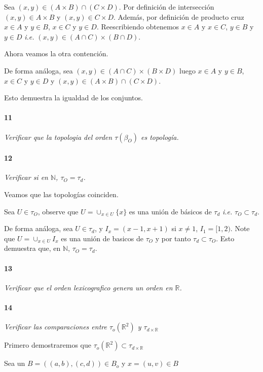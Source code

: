 \documentclass[12pt]{article}
\begin{document}
Sea $(x,y) \in (A \times B) \cap (C \times D)$. Por definición de intersección $(x,y)\in A\times B$ y $(x,y) \in C\times D$. Además, por definición
de producto cruz $x \in A $ y $y \in B$, $x \in C$ y $y \in D$. Reescribiendo obtenemos $x\in A$ y $x\in C$, $y \in B$ y $y\in D$ \textit{i.e.}  $(x,y) \in (A \cap C)\times (B \cap D)$.

Ahora veamos la otra contención.

De forma análoga, sea $(x,y) \in (A \cap C) \times (B \times D)$ luego  $x \in A $ y $y \in B$, $x \in C$ y $y \in D$ y $(x,y) \in (A \times B) \cap (C \times D)$.

Esto demuestra la igualdad de los conjuntos.
\paragraph{11}
\textit{Verificar que la topologia del orden $\tau(\beta_O)$ es topología.}

\paragraph{12}
\textit{Verificar si en $\mathbb{N}$,  $\tau_O =\tau_d$.}

Veamos que las topologías coinciden.

Sea $U \in \tau_O$, observe que $U= \cup_{x\in U} \{x\}$ es una unión de básicos de $\tau_d$ \textit{i.e.} $\tau_O \subset \tau_d$.

De forma análoga, sea $U \in \tau_d$, y $I_x=(x-1,x+1)$ si $x \neq 1$, $I_1=[1,2)$. Note que $U=\cup_{x\in U} I_x$ es una unión de 
basicos de $\tau_O$ y por tanto $\tau_d \subset \tau_O$. Esto demuestra que, en $\mathbb{N}$, $\tau_O =\tau_d$.

\paragraph{13}
\textit{Verificar que el orden lexicografico genera un orden en $\mathbb{R}$.}

\paragraph{14}
\textit{Verificar las comparaciones entre $\tau_o(\mathbb{R}^2)$ y $\tau_{d\times \mathbb{R}}$}

Primero demostraremos que $\tau_o(\mathbb{R}^2)\subset \tau_{d\times \mathbb{R}}$

Sea un $B=((a,b),(c,d))\in B_o$ y $x=(u,v)\in B$
\end{document}

